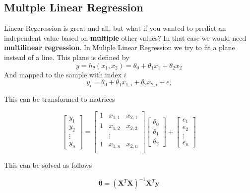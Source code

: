 \documentclass[11pt]{article}
\begin{document}
\subsection{Multple Linear Regression}

Linear Regeression is great and all, but what if you wanted to predict an independent value based on \textbf{multiple} other values? In that case we would need \textbf{multilinear regression}.
\noindent
In Muliple Linear Regression we try to fit a plane instead of a line. This plane is defined by
\begin{equation}
    y = h_\theta(x_1,x_2) = \theta_0 + \theta_1 x_1 + \theta_2 x_2
\end{equation}
And mapped to the sample with index $i$
\begin{equation*}
    y_i = \theta_0 + \theta_1 x_{1,i} + \theta_2 x_{2,i} + e_i
\end{equation*}

This can be transformed to matrices

\begin{equation*}
    \begin{bmatrix}
        y_1    \\
        y_2    \\
        \vdots \\
        y_n
    \end{bmatrix}
    =
    \begin{bmatrix}
        1 & x_{1,1} & x_{2,1} \\
        1 & x_{1,2} & x_{2,2} \\
          & \vdots  &         \\
        1 & x_{1,n} & x_{2,n} \\
    \end{bmatrix}
    \begin{bmatrix}
        \theta_0 \\
        \theta_1 \\
        \theta_2
    \end{bmatrix}
    +
    \begin{bmatrix}
        e_1    \\
        e_2    \\
        \vdots \\
        e_n
    \end{bmatrix}
\end{equation*}

This can be solved as follows

\begin{equation*}
    \bm{\theta} = (\bm{X}^T\bm{X})^{-1}\bm{X}^T\bm{y}
\end{equation*}
\end{document}
